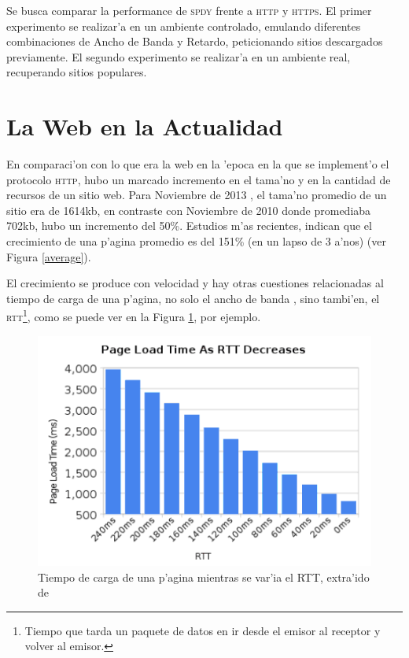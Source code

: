 \documentclass[a4paper,11pt,twocolumn]{article}
\begin{document}
Se busca comparar la performance de \textsc{spdy} frente a \textsc{http} y \textsc{https}. El primer experimento se realizar'a en un ambiente controlado, emulando diferentes combinaciones de Ancho de Banda y Retardo, peticionando sitios descargados previamente. El segundo experimento se realizar'a en un ambiente real, recuperando sitios populares.

\section{La Web en la Actualidad}

En comparaci'on con lo que era la web en la 'epoca en la que se implement'o el protocolo \textsc{http}, hubo un marcado incremento en el tama'no y en la cantidad de recursos de un sitio web. Para Noviembre de 2013 \cite{httpArchive}, el tama'no promedio de un sitio era de 1614kb, en contraste con Noviembre de 2010 donde promediaba 702kb, hubo un incremento del 50\%. Estudios m'as recientes, indican que el crecimiento de una p'agina promedio es del 151\% (en un lapso de 3 a'nos) \cite{tammy} (ver Figura \ref{average}).

El crecimiento se produce con velocidad \cite{averageWebPage} y hay otras cuestiones relacionadas al tiempo de carga de una p'agina, no solo el ancho de banda \cite{moreBand}, sino tambi'en, el \textsc{rtt}\footnote{Tiempo que tarda un paquete de datos en ir desde el emisor al receptor y volver al emisor.}, como se puede ver en la Figura \ref{rttBelsche}, por ejemplo.

\begin{figure}[h!]
  	\centering
	\includegraphics[scale=0.5]{belsche}
	\caption{\small Tiempo de carga de una p'agina mientras se var'ia el RTT, extra'ido de \cite{moreBand}}
	\label{rttBelsche}
\end{figure}
\end{document}

